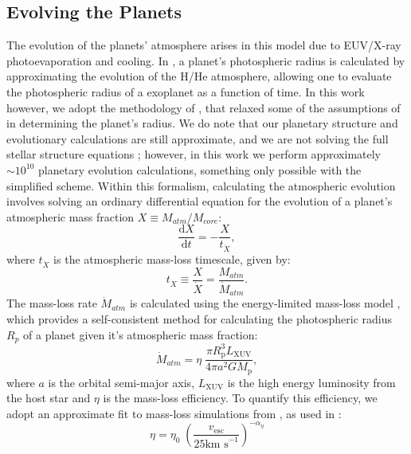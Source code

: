 \documentclass[fleqn,usenatbib]{mnras}
\begin{document}
\subsection{Evolving the Planets} \label{sec:EvolvingPlanets}
The evolution of the planets' atmosphere arises in this model due to EUV/X-ray photoevaporation and cooling. In \cite{Owen2017}, a planet's photospheric radius is calculated by approximating the evolution of the H/He atmosphere, allowing one to evaluate the photospheric radius of a exoplanet as a function of time. In this work however, we adopt the methodology of \cite{OwenEstrada2020}, that relaxed some of the assumptions of \citet{Owen2017} in determining the planet's radius. We do note that our planetary structure and evolutionary calculations are still approximate, and we are not solving the full stellar structure equations \citep[unlike, e.g.][]{Owen2013,OwenMorton2016,ChenRogers2016}; however, in this work we perform approximately $\sim 10^{10}$ planetary evolution calculations, something only possible with the simplified scheme. Within this formalism,  calculating the atmospheric evolution involves solving an ordinary differential equation for the evolution of a planet's atmospheric mass fraction $X \equiv M_{atm} / M_{core}$:
\begin{equation} \label{eq:ODE}
    \frac{\mathrm{d}X}{\mathrm{d}t} = -\frac{X}{t_{\dot{X}}},
\end{equation}
where $t_{\dot{X}}$ is the atmospheric mass-loss timescale, given by:
\begin{equation}
    t_{\dot{X}} \equiv \frac{X}{\dot{X}} = \frac{M_{atm}}{\dot{M}_{atm}}.
\end{equation}
The mass-loss rate $\dot{M}_{atm}$ is calculated using the energy-limited mass-loss model \citep[e.g.][]{Baraffe2004,Erkaev2007}, which provides a self-consistent method for calculating the photospheric radius $R_{p}$ of a planet given it's atmospheric mass fraction:
\begin{equation} \label{eq:massloss}
    \dot{M}_{atm} = \eta \; \frac{\pi R_\text{p}^3 L_\text{XUV}}{4 \pi a^2 GM_\text{p}},
\end{equation}
where $a$ is the orbital semi-major axis, $L_\text{XUV}$ is the high energy luminosity from the host star and $\eta$ is the mass-loss efficiency. To quantify this efficiency, we adopt an approximate fit to mass-loss simulations from \cite{OwenJackson2012}, as used in \cite{Owen2017,Wu2019}:
\begin{equation} \label{eq:masslossefficiency}
    \eta = \eta_0 \; \left( \frac{v_\text{esc}}{25\text{km s}^{-1}} \right ) ^{-\alpha_\eta}
\end{equation}
\end{document}
